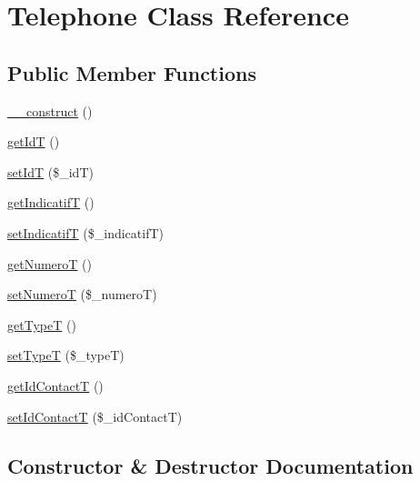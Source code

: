 \hypertarget{class_telephone}{}\section{Telephone Class Reference}
\label{class_telephone}
\subsection*{Public Member Functions}
\begin{DoxyCompactItemize}
\item 
\hyperlink{class_telephone_a095c5d389db211932136b53f25f39685}{\+\_\+\+\_\+construct} ()
\item 
\hyperlink{class_telephone_a1939d0f2b242d305ac70f72c53f2f20b}{get\+IdT} ()
\item 
\hyperlink{class_telephone_ab9ef23d090b57d8c859c184c0a6eedcc}{set\+IdT} (\$\+\_\+idT)
\item 
\hyperlink{class_telephone_accd08a1eee4717b029979baca902c535}{get\+IndicatifT} ()
\item 
\hyperlink{class_telephone_ab6bf8385aab0e358abde5765c80a934f}{set\+IndicatifT} (\$\+\_\+indicatifT)
\item 
\hyperlink{class_telephone_af821c49d9b6fa23e50cfdf5a8c663386}{get\+NumeroT} ()
\item 
\hyperlink{class_telephone_a0e32ff398480ba0c68a1c25b8fb7e4a8}{set\+NumeroT} (\$\+\_\+numeroT)
\item 
\hyperlink{class_telephone_aab4f775b08fc3c7e3dea604b761badb3}{get\+TypeT} ()
\item 
\hyperlink{class_telephone_a43286b238b0c8302ab1a44414a7a1302}{set\+TypeT} (\$\+\_\+typeT)
\item 
\hyperlink{class_telephone_a505a6a187cd94f20d159e8e4ef22fcf6}{get\+Id\+ContactT} ()
\item 
\hyperlink{class_telephone_a1a07b52642ad0c3920743d2cbc936358}{set\+Id\+ContactT} (\$\+\_\+id\+ContactT)
\end{DoxyCompactItemize}


\subsection{Constructor \& Destructor Documentation}
\mbox{\label{class_telephone_a095c5d389db211932136b53f25f39685}} 
